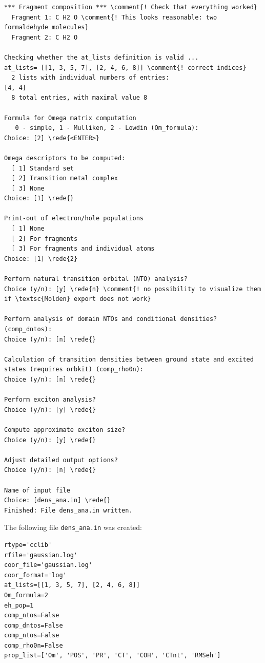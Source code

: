 \documentclass[DIV=12,headings=normal]{scrartcl}
\newcommand{\comment}[1]{\textcolor{blue}{#1}}
\newcommand{\redl}[1]{{\textcolor{red}{\underline{#1}}}}
\newcommand{\rede}[1]{\redl{#1 <ENTER>}}
\newcounter{number}
\begin{document}
\scriptsize
\begin{Verbatim}[commandchars=\\\{\}]
*** Fragment composition *** \comment{! Check that everything worked}
  Fragment 1: C H2 O \comment{! This looks reasonable: two formaldehyde molecules}
  Fragment 2: C H2 O

Checking whether the at_lists definition is valid ...
at_lists= [[1, 3, 5, 7], [2, 4, 6, 8]] \comment{! correct indices}
  2 lists with individual numbers of entries:
[4, 4]
  8 total entries, with maximal value 8
  
Formula for Omega matrix computation
   0 - simple, 1 - Mulliken, 2 - Lowdin (Om_formula):
Choice: [2] \rede{<ENTER>}

Omega descriptors to be computed:
  [ 1] Standard set
  [ 2] Transition metal complex
  [ 3] None
Choice: [1] \rede{}

Print-out of electron/hole populations
  [ 1] None
  [ 2] For fragments
  [ 3] For fragments and individual atoms
Choice: [1] \rede{2}

Perform natural transition orbital (NTO) analysis?
Choice (y/n): [y] \rede{n} \comment{! no possibility to visualize them if \textsc{Molden} export does not work}

Perform analysis of domain NTOs and conditional densities? (comp_dntos):
Choice (y/n): [n] \rede{}

Calculation of transition densities between ground state and excited states (requires orbkit) (comp_rho0n):
Choice (y/n): [n] \rede{}

Perform exciton analysis?
Choice (y/n): [y] \rede{}

Compute approximate exciton size?
Choice (y/n): [y] \rede{}

Adjust detailed output options?
Choice (y/n): [n] \rede{}

Name of input file
Choice: [dens_ana.in] \rede{}
Finished: File dens_ana.in written.
\end{Verbatim}
\normalsize

The following file \texttt{dens\_ana.in} was created:

\scriptsize
\begin{Verbatim}[commandchars=\\\{\}]
rtype='cclib'
rfile='gaussian.log'
coor_file='gaussian.log'
coor_format='log'
at_lists=[[1, 3, 5, 7], [2, 4, 6, 8]]
Om_formula=2
eh_pop=1
comp_ntos=False
comp_dntos=False
comp_ntos=False
comp_rho0n=False
prop_list=['Om', 'POS', 'PR', 'CT', 'COH', 'CTnt', 'RMSeh']
\end{Verbatim}
\normalsize
\end{document}
